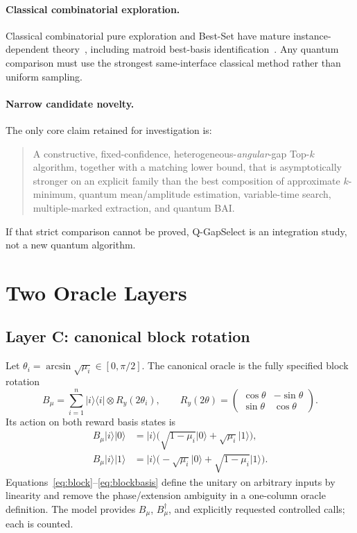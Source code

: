\documentclass[10pt]{article}
\theoremstyle{definition}
\newcommand{\ket}[1]{\lvert #1\rangle}
\newcommand{\bra}[1]{\langle #1\rvert}
\begin{document}
\paragraph{Classical combinatorial exploration.}
Classical combinatorial pure exploration and Best-Set have mature
instance-dependent theory~\cite{chen2014cpe,chen2017nearly}, including matroid
best-basis identification~\cite{chen2016matroid}.  Any quantum comparison must
use the strongest same-interface classical method rather than uniform sampling.

\paragraph{Narrow candidate novelty.}
The only core claim retained for investigation is:
\begin{quote}
A constructive, fixed-confidence, heterogeneous-\emph{angular}-gap Top-$k$
algorithm, together with a matching lower bound, that is asymptotically stronger
on an explicit family than the best composition of approximate $k$-minimum,
quantum mean/amplitude estimation, variable-time search, multiple-marked
extraction, and quantum BAI.
\end{quote}
If that strict comparison cannot be proved, Q-GapSelect is an integration study,
not a new quantum algorithm.

\section{Two Oracle Layers}

\subsection{Layer C: canonical block rotation}

Let $\theta_i=\arcsin\sqrt{\mu_i}\in[0,\pi/2]$.  The canonical oracle is the
fully specified block rotation
\begin{equation}
 B_\mu=\sum_{i=1}^{n}\ket{i}\bra{i}\otimes R_y(2\theta_i),
 \qquad
 R_y(2\theta)=
 \begin{pmatrix}
 \cos\theta&-\sin\theta\\
 \sin\theta& \cos\theta
 \end{pmatrix}.
 \label{eq:block}
\end{equation}
Its action on both reward basis states is
\begin{align}
 B_\mu\ket{i}\ket{0}
 &=\ket{i}\bigl(\sqrt{1-\mu_i}\ket{0}+\sqrt{\mu_i}\ket{1}\bigr),\\
 B_\mu\ket{i}\ket{1}
 &=\ket{i}\bigl(-\sqrt{\mu_i}\ket{0}+\sqrt{1-\mu_i}\ket{1}\bigr).
 \label{eq:blockbasis}
\end{align}
Equations~\eqref{eq:block}--\eqref{eq:blockbasis} define the unitary on arbitrary
inputs by linearity and remove the phase/extension ambiguity in a one-column
oracle definition.  The model provides $B_\mu$, $B_\mu^\dagger$, and explicitly
requested controlled calls; each is counted.
\end{document}
